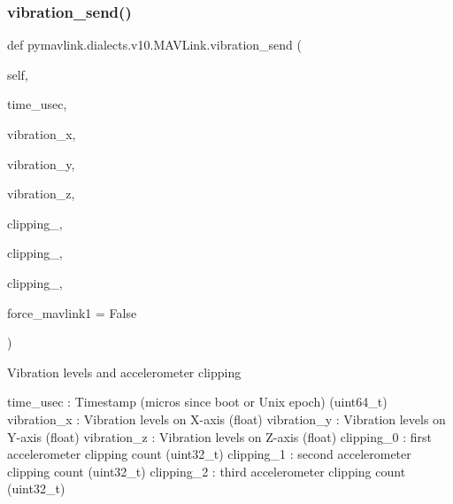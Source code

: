 \begin{DoxyVerb}
\begin{DoxyVerb}
\begin{DoxyVerb}
\begin{DoxyVerb}
\begin{DoxyVerb}
\begin{DoxyVerb}
\begin{DoxyVerb}
\begin{DoxyVerb}
\begin{DoxyVerb}
\begin{DoxyVerb}
\subsubsection{\texorpdfstring{vibration\+\_\+send()}{vibration\_send()}}
{\footnotesize\ttfamily def pymavlink.\+dialects.\+v10.\+M\+A\+V\+Link.\+vibration\+\_\+send (\begin{DoxyParamCaption}\item[{}]{self,  }\item[{}]{time\+\_\+usec,  }\item[{}]{vibration\+\_\+x,  }\item[{}]{vibration\+\_\+y,  }\item[{}]{vibration\+\_\+z,  }\item[{}]{clipping\+\_,  }\item[{}]{clipping\+\_,  }\item[{}]{clipping\+\_,  }\item[{}]{force\+\_\+mavlink1 = {\ttfamily False} }\end{DoxyParamCaption})}

\begin{DoxyVerb}Vibration levels and accelerometer clipping

time_usec                 : Timestamp (micros since boot or Unix epoch) (uint64_t)
vibration_x               : Vibration levels on X-axis (float)
vibration_y               : Vibration levels on Y-axis (float)
vibration_z               : Vibration levels on Z-axis (float)
clipping_0                : first accelerometer clipping count (uint32_t)
clipping_1                : second accelerometer clipping count (uint32_t)
clipping_2                : third accelerometer clipping count (uint32_t)\end{DoxyVerb}
 \mbox{\label{classpymavlink_1_1dialects_1_1v10_1_1MAVLink_a67d3142f1810c8969c35386ce3c2f793}} 

\end{DoxyVerb}
\end{DoxyVerb}
\end{DoxyVerb}
\end{DoxyVerb}
\end{DoxyVerb}
\end{DoxyVerb}
\end{DoxyVerb}
\end{DoxyVerb}
\end{DoxyVerb}
\end{DoxyVerb}
